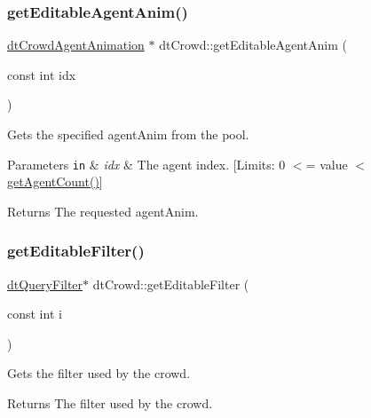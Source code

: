 \subsubsection{\texorpdfstring{get\+Editable\+Agent\+Anim()}{getEditableAgentAnim()}\hspace{0.1cm}{\footnotesize\ttfamily [2/2]}}
{\footnotesize\ttfamily \hyperlink{structdtCrowdAgentAnimation}{dt\+Crowd\+Agent\+Animation} $\ast$ dt\+Crowd\+::get\+Editable\+Agent\+Anim (\begin{DoxyParamCaption}\item[{const int}]{idx }\end{DoxyParamCaption})}

Gets the specified agent\+Anim from the pool. 
\begin{DoxyParams}[1]{Parameters}
\mbox{\tt in}  & {\em idx} & The agent index. \mbox{[}Limits\+: 0 $<$= value $<$ \hyperlink{classdtCrowd_a87dc2372038ee12d9043a65737880b78}{get\+Agent\+Count()}\mbox{]} \\
\hline
\end{DoxyParams}
\begin{DoxyReturn}{Returns}
The requested agent\+Anim. 
\end{DoxyReturn}
\mbox{\label{classdtCrowd_a170a9c4cc9f88a7ee3d560abce9ad552}} 
\subsubsection{\texorpdfstring{get\+Editable\+Filter()}{getEditableFilter()}\hspace{0.1cm}{\footnotesize\ttfamily [1/2]}}
{\footnotesize\ttfamily \hyperlink{classdtQueryFilter}{dt\+Query\+Filter}$\ast$ dt\+Crowd\+::get\+Editable\+Filter (\begin{DoxyParamCaption}\item[{const int}]{i }\end{DoxyParamCaption})\hspace{0.3cm}{\ttfamily [inline]}}

Gets the filter used by the crowd. \begin{DoxyReturn}{Returns}
The filter used by the crowd. 
\end{DoxyReturn}
\mbox{\label{classdtCrowd_a170a9c4cc9f88a7ee3d560abce9ad552}} 
